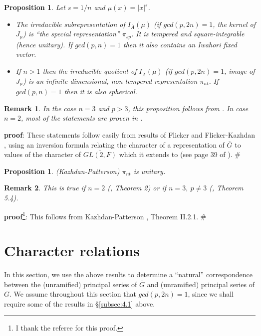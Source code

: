 \documentclass[twocolumn,10pt]{article}
\newtheorem{proposition}[theorem]{Proposition}
\newtheorem{remark}{Remark}
\begin{document}
\begin{proposition} 
Let  $s=1/n$ and $\mu (x)=|x|^s$.
\begin{itemize}
\item[(a)]
The irreducible subrepresentation
of $I_{\overline{A}}(\mu)$
(if $gcd(p,2n)=1$, the kernel of $J_\mu $)
is ``the special representation'' $\pi _{sp}$. 
It is tempered and square-integrable
(hence unitary). If $gcd(p,n)=1$ then it
also contains an Iwahori fixed vector. 
\item [(b)]
If $n>1$ then the irreducible quotient
of $I_{\overline{A}}(\mu)$
(if $gcd(p,2n)=1$, image of $J_\mu $) is 
an infinite-dimensional, non-tempered representation $\pi _{nt}$.
If $gcd(p,n)=1$ then it is also spherical.
\end{itemize}
\end{proposition}

\begin{remark}
In the case $n=3$ and $p>3$, this 
proposition follows from \cite{Ar}. 
In case $n=2$, most of the statements
are proven in \cite{GS}. 

\end{remark}

{\bf proof}: These statements follow easily from results of Flicker
\cite{F} and Flicker-Kazhdan \cite{FK}, using an
inversion formula relating the character of a representation
of $\overline{G}$ to values of the character of
$\overline{GL(2,F)}$ which it extends to (see page 39 of \cite{Sch}).
$\#$

\begin{proposition} (Kazhdan-Patterson)
$\pi _{nt}$ is unitary.
\end{proposition}

\begin{remark}
This is true if $n=2$ (\cite{GS}, Theorem 2) or
if $n=3,\ p\not= 3$ (\cite{Ar}, Theorem 5.4).
\end{remark}

{\bf proof}\footnote{I thank the referee for this proof.}:
This follows from Kazhdan-Patterson
\cite{KP}, Theorem II.2.1. $\#$

\section{Character relations}

In this section, we use the above results to determine
a ``natural'' correspondence between the (unramified)
principal series of $\overline{G}$ and (unramified)
principal series of $G$. We assume throughout this section 
that $gcd(p,2n)=1$, since we shall require
some of the results in \S \ref{subsec:4.1} above.
\end{document}
